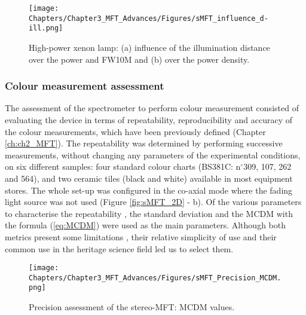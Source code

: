 \vspace{1cm}

\begin{figure*}[!h]
\centering
\texttt{[image: Chapters/Chapter3\_MFT\_Advances/Figures/sMFT\_influence\_d-ill.png]}
\caption[\hspace{0.3cm}High-power xenon lamp]{High-power xenon lamp: (a) influence of the illumination distance over the power and \acrshort{FW10M} and (b) over the power density.}
\label{fig:sMFT_influence_d-ill}
\end{figure*}


\subsubsection{Colour measurement assessment}

The assessment of the spectrometer to perform colour measurement consisted of evaluating the device in terms of repeatability, reproducibility and accuracy of the colour measurements, which have been previously defined (Chapter \ref{ch:ch2_MFT}). The repeatability was determined by performing successive measurements, without changing any parameters of the experimental conditions, on six different samples: four standard colour charts (BS381C: n$^\circ$309, 107, 262 and 564), and two ceramic tiles (black and white) available in most equipment stores. The whole set-up was configured in the co-axial mode where the fading light source was not used (Figure \ref{fig:sMFT_2D} - b). Of the various parameters to characterise the repeatability \citep{wyble_evaluation_2007}, the standard deviation and the \gls{MCDM} with the \dEOO formula (\ref{eq:MCDM}) were used as the main parameters. Although both metrics present some limitations \citep[126]{berns_billmeyer_2019}, their relative simplicity of use and their common use in the heritage science field led us to select them.\\

\vspace{0.8cm}

\begin{figure*}[!h]
\centering
\texttt{[image: Chapters/Chapter3\_MFT\_Advances/Figures/sMFT\_Precision\_MCDM.png]}
\caption[\hspace{0.3cm}Precision assessment of the stereo-MFT]{Precision assessment of the stereo-MFT: \acrshort{MCDM} values.}
\label{fig:sMFT_precision}
\end{figure*}

